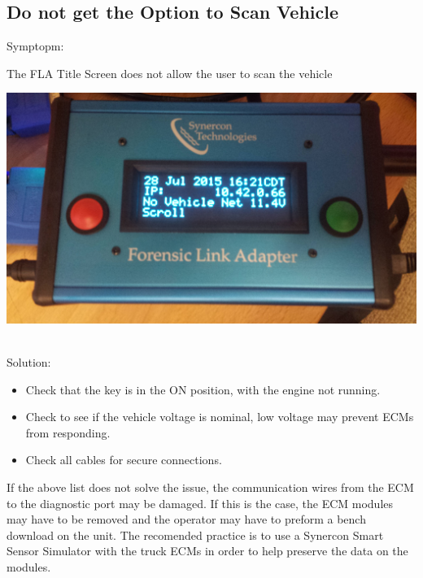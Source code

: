 \documentclass[11pt]{article}
\begin{document}
\subsection{Do not get the Option to Scan Vehicle}
Symptopm:\\
\noindent\begin{minipage}{0.3\textwidth}%
The FLA Title Screen does not allow the user to scan the vehicle
\end{minipage}%
\hfill%
\begin{minipage}{0.6\textwidth}
\includegraphics[width=\linewidth]{./fla_screens/title_screen_no_veh_net}
\end{minipage}\\
Solution:\\
\begin{itemize}
\item Check that the key is in the ON position, with the engine not running.
\item Check to see if the vehicle voltage is nominal, low voltage may prevent ECMs from responding.
\item Check all cables for secure connections.
\end{itemize}
If the above list does not solve the issue, the communication wires from the ECM to the diagnostic port may be damaged. If this is the case, the ECM modules may have to be removed and the operator may have to preform a bench download on the unit. The recomended practice is to use a Synercon Smart Sensor Simulator with the truck ECMs in order to help preserve the data on the modules.
\end{document}
